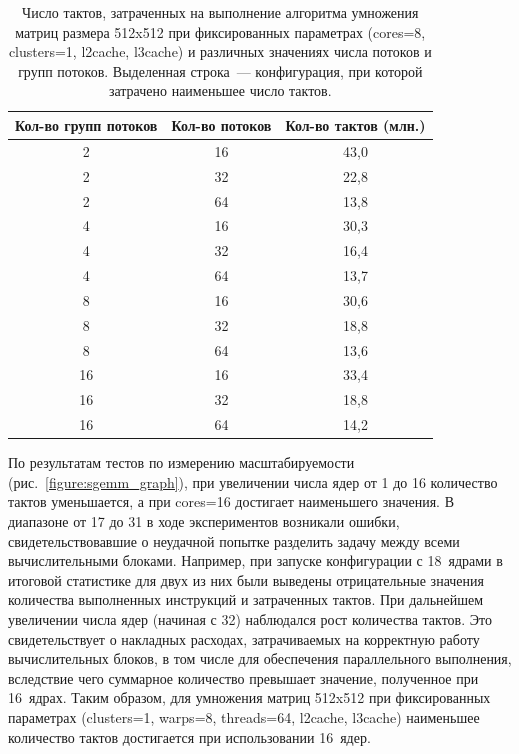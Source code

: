 \documentclass[a4paper]{article}
\begin{document}
\begin{table}[h]
\centering
\begin{tabular}{| c|c|c |}
 \hline
 Кол-во групп потоков & Кол-во потоков & Кол-во тактов (млн.) \\
 \hline
 2 & 16 & 43,0 \\
 2 & 32 & 22,8 \\
 2 & 64 & 13,8 \\

 4 & 16 & 30,3 \\
 4 & 32 & 16,4 \\
 4 & 64 & 13,7 \\

 8 & 16 & 30,6 \\
 8 & 32 & 18,8 \\
 \rowcolor{lightgray}
 8 & 64 & 13,6 \\

 16 & 16 & 33,4 \\
 16 & 32 & 18,8 \\
 16 & 64 & 14,2 \\
 \hline
\end{tabular}
\caption{\label{tab:optimal_for_8} Число тактов, затраченных на выполнение алгоритма умножения матриц размера 512x512 при фиксированных параметрах (cores=8, clusters=1, l2cache, l3cache) и различных значениях числа потоков и групп потоков. Выделенная строка~--- конфигурация, при которой затрачено наименьшее число тактов.}
\end{table}

По результатам тестов по измерению масштабируемости (рис.~\ref{figure:sgemm_graph}), при увеличении числа ядер от 1 до 16 количество тактов уменьшается, а при cores=16 достигает наименьшего значения. В диапазоне от 17 до 31 в ходе экспериментов возникали ошибки, свидетельствовавшие о неудачной попытке разделить задачу между всеми вычислительными блоками. Например, при запуске конфигурации с 18~ядрами в итоговой статистике для двух из них были выведены отрицательные значения количества выполненных инструкций и затраченных тактов. При дальнейшем увеличении числа ядер (начиная с 32) наблюдался рост количества тактов. Это свидетельствует о накладных расходах, затрачиваемых на корректную работу вычислительных блоков, в том числе для обеспечения параллельного выполнения, вследствие чего суммарное количество превышает значение, полученное при 16~ядрах. Таким образом, для умножения матриц 512x512 при фиксированных параметрах (clusters=1, warps=8, threads=64, l2cache, l3cache) наименьшее количество тактов достигается при использовании 16~ядер.
\end{document}
